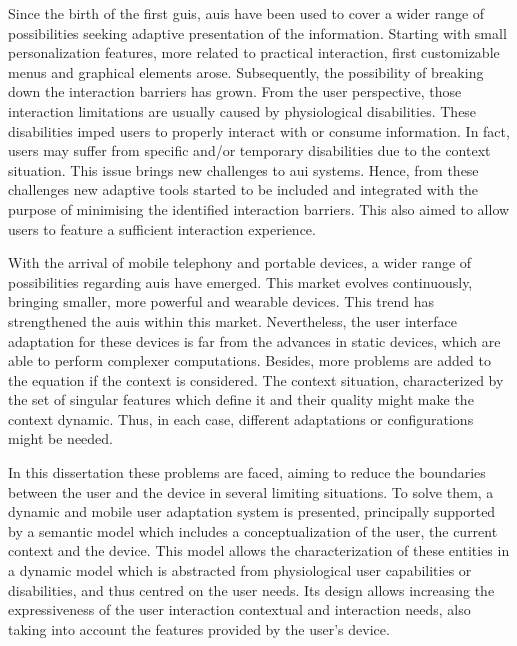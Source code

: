 




\begin{abstracts}        %
Since the birth of the first \acp{gui}, \acp{aui} have been used to cover
a wider range of possibilities seeking adaptive presentation of the information. 
Starting 
with small personalization features, more related to practical interaction, 
first customizable menus and graphical elements arose. Subsequently, the 
possibility of breaking down the interaction barriers has grown. From the user
perspective, those interaction limitations are usually caused by physiological 
disabilities. These disabilities imped users to properly interact with or consume 
information. In fact, users may suffer from specific and/or temporary disabilities 
due to the context situation. This issue brings new challenges to \ac{aui} systems.
Hence, from these challenges new adaptive tools started to be included and 
integrated with the purpose of minimising the identified interaction barriers. 
This also aimed to allow users to feature a sufficient interaction experience.

With the arrival of mobile telephony and portable devices, a wider range of
possibilities regarding \acp{aui} have emerged. This market evolves continuously, 
bringing smaller, more powerful and wearable devices. This trend has strengthened 
the \acp{aui} within this market. Nevertheless, the user interface adaptation for 
these devices is far from the advances in static devices, which are able to perform 
complexer computations. Besides, more problems are added to the equation if the 
context is considered. The context situation, characterized by the set of singular 
features which define it and their quality might make the context dynamic. Thus, 
in each case, different adaptations or configurations might be needed. 

In this dissertation these problems are faced, aiming to reduce the boundaries
between the user and the device in several limiting situations. To solve them, 
a dynamic and mobile user adaptation system is presented, principally supported 
by a semantic model which includes a conceptualization of the user, the current
context and the device. This model allows the characterization of these entities 
in a dynamic model which is abstracted from physiological user capabilities or 
disabilities, and thus centred on the user needs. Its design allows increasing 
the expressiveness of the user interaction contextual and interaction needs, 
also taking into account the features provided by the user's device.


\end{abstracts}

